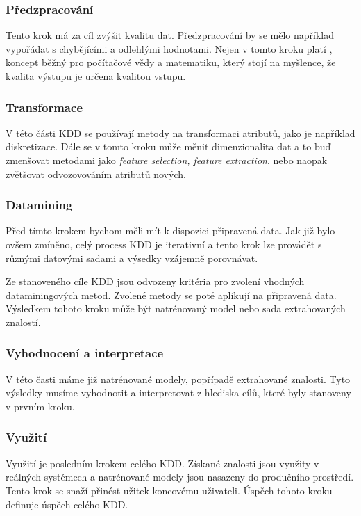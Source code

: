 \documentclass[thesis=M,czech]{FITthesis}[2012/06/26]
\begin{document}
\subsubsection*{Předzpracování}
Tento krok má za cíl zvýšit kvalitu dat. Předzpracování by se mělo například vypořádat s chybějícími a odlehlými hodnotami. Nejen v tomto kroku platí , koncept běžný pro počítačové vědy a matematiku, který stojí na myšlence, že kvalita výstupu je určena kvalitou vstupu\cite{g_in_g_out}.

\subsubsection*{Transformace }
\label{subsec:transformace}

V této části KDD se používají metody na transformaci atributů, jako je například diskretizace. Dále se v tomto kroku může měnit dimenzionalita dat a to buď zmenšovat metodami jako \textit{feature selection, feature extraction}, nebo naopak zvětšovat odvozovováním atributů nových. 


\subsubsection*{Datamining}
Před tímto krokem bychom měli mít k dispozici připravená data. Jak již bylo ovšem zmíněno, celý process KDD je iterativní a tento krok lze provádět s různými datovými sadami a výsedky vzájemně porovnávat.

Ze stanoveného cíle KDD jsou odvozeny kritéria pro zvolení vhodných dataminingových metod. Zvolené metody se poté aplikují na připravená data. Výsledkem tohoto kroku může být natrénovaný model nebo sada extrahovaných znalostí.

\subsubsection*{Vyhodnocení a interpretace}
V této časti máme již natrénované modely, popřípadě extrahované znalosti. Tyto výsledky musíme vyhodnotit a interpretovat z hlediska cílů, které byly stanoveny v prvním kroku.

\subsubsection*{Využití}
Využití je posledním krokem celého KDD. Získané znalosti jsou využity v reálných systémech a natrénované modely jsou nasazeny do produčního prostředí. Tento krok se snaží přinést užitek koncovému uživateli. Úspěch tohoto kroku definuje úspěch celého KDD.	
	
\end{document}
